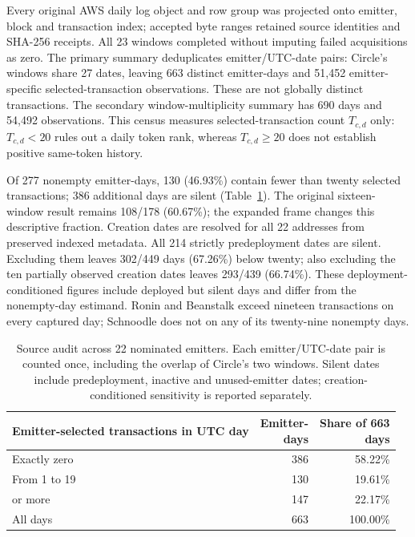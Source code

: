 \documentclass[preprint,12pt,authoryear]{elsarticle}
\begin{document}
Every original AWS daily log object and row group was projected onto emitter, block and transaction index; accepted byte ranges retained source identities and SHA-256 receipts. All 23 windows completed without imputing failed acquisitions as zero. The primary summary deduplicates emitter/UTC-date pairs: Circle's windows share 27 dates, leaving 663 distinct emitter-days and 51,452 emitter-specific selected-transaction observations. These are not globally distinct transactions. The secondary window-multiplicity summary has 690 days and 54,492 observations. This census measures selected-transaction count $T_{c,d}$ only: $T_{c,d}<20$ rules out a daily token rank, whereas $T_{c,d}\geq20$ does not establish positive same-token history.

Of 277 nonempty emitter-days, 130 (46.93\%) contain fewer than twenty selected transactions; 386 additional days are silent (Table~\ref{tab:newframe}). The original sixteen-window result remains 108/178 (60.67\%); the expanded frame changes this descriptive fraction. Creation dates are resolved for all 22 addresses from preserved indexed metadata. All 214 strictly predeployment dates are silent. Excluding them leaves 302/449 days (67.26\%) below twenty; also excluding the ten partially observed creation dates leaves 293/439 (66.74\%). These deployment-conditioned figures include deployed but silent days and differ from the nonempty-day estimand. Ronin and Beanstalk exceed nineteen transactions on every captured day; Schnoodle does not on any of its twenty-nine nonempty days.

\begin{table}[htbp]
\centering\small
\caption{Source audit across 22 nominated emitters. Each emitter/UTC-date pair is counted once, including the overlap of Circle's two windows. Silent dates include predeployment, inactive and unused-emitter dates; creation-conditioned sensitivity is reported separately.}
\label{tab:newframe}
\begin{tabularx}{\linewidth}{@{}>{\raggedright\arraybackslash}X r r@{}}
\toprule
Emitter-selected transactions in UTC day & \shortstack{Emitter-\\days} & \shortstack{Share of 663\\days}\\
\midrule
Exactly zero & 386 & 58.22\%\\
From 1 to 19 & 130 & 19.61\%\\
20 or more & 147 & 22.17\%\\
\midrule
All days & 663 & 100.00\%\\
\bottomrule
\end{tabularx}
\end{table}
\end{document}
